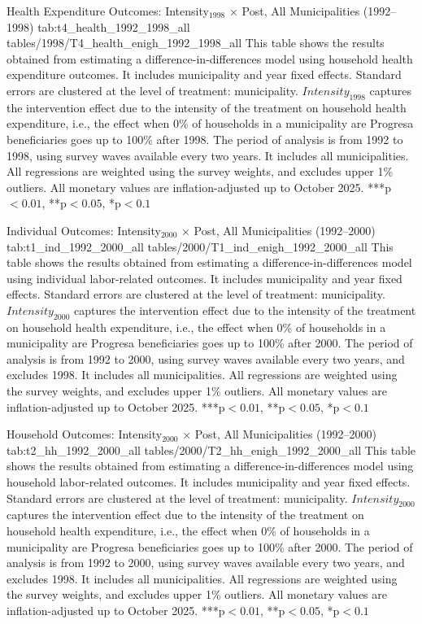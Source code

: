 \mectable%
  {Health Expenditure Outcomes: Intensity$_{1998}$ $\times$ Post, All Municipalities (1992--1998)}%
  {tab:t4_health_1992_1998_all}%
  {tables/1998/T4_health_enigh_1992_1998_all}%
  {This table shows the results obtained from estimating a difference-in-differences model using household health expenditure outcomes. It includes municipality and year fixed effects. Standard errors are clustered at the level of treatment: municipality. $Intensity_{1998}$ captures the intervention effect due to the intensity of the treatment on household health expenditure, i.e., the effect when 0\% of households in a municipality are Progresa beneficiaries goes up to 100\% after 1998. The period of analysis is from 1992 to 1998, using survey waves available every two years. It includes all municipalities. All regressions are weighted using the survey weights, and excludes upper 1\% outliers. All monetary values are inflation-adjusted up to October 2025. ***p$<0.01$, **p$<0.05$, *p$<0.1$}%




\mectable%
  {Individual Outcomes: Intensity$_{2000}$ $\times$ Post, All Municipalities (1992--2000)}%
  {tab:t1_ind_1992_2000_all}%
  {tables/2000/T1_ind_enigh_1992_2000_all}%
  {This table shows the results obtained from estimating a difference-in-differences model using individual labor-related outcomes. It includes municipality and year fixed effects. Standard errors are clustered at the level of treatment: municipality. $Intensity_{2000}$ captures the intervention effect due to the intensity of the treatment on household health expenditure, i.e., the effect when 0\% of households in a municipality are Progresa beneficiaries goes up to 100\% after 2000. The period of analysis is from 1992 to 2000, using survey waves available every two years, and excludes 1998. It includes all municipalities. All regressions are weighted using the survey weights, and excludes upper 1\% outliers. All monetary values are inflation-adjusted up to October 2025. ***p$<0.01$, **p$<0.05$, *p$<0.1$}%
  
\mectable%
  {Household Outcomes: Intensity$_{2000}$ $\times$ Post, All Municipalities (1992--2000)}%
  {tab:t2_hh_1992_2000_all}%
  {tables/2000/T2_hh_enigh_1992_2000_all}%
  {This table shows the results obtained from estimating a difference-in-differences model using household labor-related outcomes. It includes municipality and year fixed effects. Standard errors are clustered at the level of treatment: municipality. $Intensity_{2000}$ captures the intervention effect due to the intensity of the treatment on household health expenditure, i.e., the effect when 0\% of households in a municipality are Progresa beneficiaries goes up to 100\% after 2000. The period of analysis is from 1992 to 2000, using survey waves available every two years, and excludes 1998. It includes all municipalities. All regressions are weighted using the survey weights, and excludes upper 1\% outliers. All monetary values are inflation-adjusted up to October 2025. ***p$<0.01$, **p$<0.05$, *p$<0.1$}%

